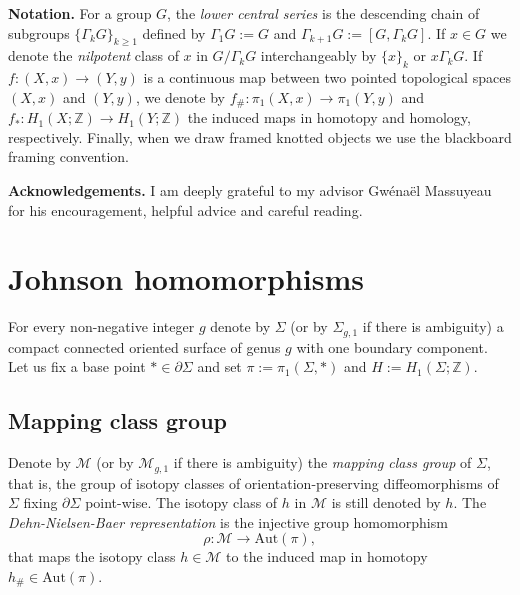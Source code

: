 \documentclass[10pt]{amsart}
\numberwithin{equation}{section}
\numberwithin{equation}{section}
\theoremstyle{definition}
\begin{document}
\medskip

\noindent\textbf{Notation.} For a group $G$, the \emph{lower central series} is the descending chain of subgroups $\{\Gamma_k G\}_{k\geq1}$ defined by $\Gamma_1 G:=G$ and $\Gamma_{k+1}G:=[G,\Gamma_{k}G]$. If $x\in G$  we denote the \emph{nilpotent} class of $x$ in $G/\Gamma_k G$ interchangeably by $\{x\}_k$ or $x\Gamma_k G$. If $f:(X,x)\rightarrow (Y,y)$ is a continuous map between two pointed topological spaces  $(X,x)$ and $(Y,y)$, we denote by $f_{\#}:\pi_1(X,x)\rightarrow\pi_1(Y,y)$ and $f_{*}:H_1(X;\mathbb{Z})\rightarrow H_1(Y;\mathbb{Z})$ the induced maps in homotopy and homology, respectively. Finally, when we draw framed knotted objects we use the blackboard framing convention. 

\medskip 

\noindent\textbf{Acknowledgements.} I am deeply grateful to my advisor Gw\'ena\"{e}l Massuyeau for his  encouragement, helpful advice and careful reading.


\section{Johnson homomorphisms}\label{seccion2}%

For every non-negative integer $g$ denote by $\Sigma$ (or  by $\Sigma_{g,1}$ if there is  ambiguity) a compact connected oriented surface of genus $g$ with  one boundary component.  Let us fix a base point $*\in\partial\Sigma$ and set $\pi:=\pi_1(\Sigma,*)$ and $H:=H_1(\Sigma;\mathbb{Z})$.
\subsection{Mapping class group}

Denote by $\mathcal{M}$ (or  by $\mathcal{M}_{g,1}$ if there is ambiguity) the \emph{mapping class group} of $\Sigma$, that is, the group of isotopy classes of orientation-preserving diffeomorphisms of $\Sigma$ fixing $\partial \Sigma$ point-wise. The isotopy class of $h$ in $\mathcal{M}$ is still denoted by $h$.
The \emph{Dehn-Nielsen-Baer representation} is the injective group homomorphism
$$\rho:\mathcal{M}\longrightarrow \text{Aut}(\pi),$$
\noindent that maps the isotopy class $h\in \mathcal{M}$ to the induced map in homotopy $h_\#\in\text{Aut}(\pi)$. 
\end{document}
